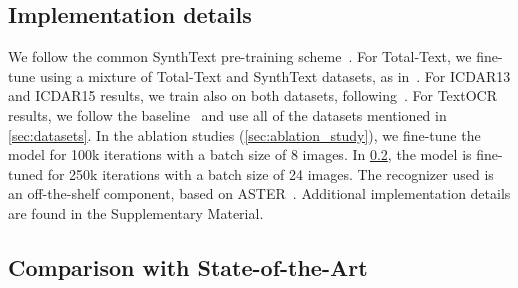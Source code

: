 \documentclass[runningheads]{llncs}
\begin{document}
\subsection{Implementation details}
\label{sec:implementation}
We follow the common SynthText pre-training scheme~\cite{liao2020spotterV3,baek2020crafts}.
For Total-Text, we fine-tune using a mixture of Total-Text and SynthText datasets, as in~\cite{baek2020crafts}.
For ICDAR13 and ICDAR15 results, we train also on both datasets, following~\cite{liao2020spotterV3}.
For TextOCR results, we follow the baseline~\cite{singh2021textocr} and use all of the datasets mentioned in \cref{sec:datasets}. 
In the ablation studies (\cref{sec:ablation_study}), we fine-tune the model for 100k iterations with a batch size of 8 images.
In \cref{sec:results}, the model is fine-tuned for 250k iterations with a batch size of 24 images.
The recognizer used is an off-the-shelf component, based on ASTER~\cite{shi2018aster}.
Additional implementation details are found in the Supplementary Material.

\subsection{Comparison with State-of-the-Art}
\label{sec:results}
\end{document}
